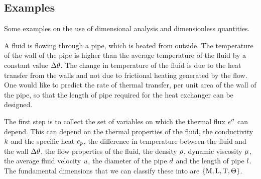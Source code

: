 \subsection{Examples}
Some examples on the use of dimensional analysis and dimensionless quantities.

\begin{example}
A fluid is flowing through a pipe, which is heated from outside. The temperature of the wall of the pipe is higher than the average temperature of the fluid by a constant value $\Delta\theta$. The change in temperature of the fluid is due to the heat transfer from the walls and not due to frictional heating generated by the flow. One would like to predict the rate of thermal transfer, per unit area of the wall of the pipe, so that the length of pipe required for the heat exchanger can be designed.
\end{example}

\begin{solution}
The first step is to collect the set of variables on which the thermal flux ${e}^{\prime\prime}$ can depend. This can depend on the thermal properties of the fluid, the conductivity $k$ and the specific heat $c_p$, the difference in temperature between the fluid and the wall $\Delta\theta$, the flow properties of the fluid, the density $\rho$, dynamic viscosity $\mu$, the average fluid velocity $u$, the diameter of the pipe $d$ and the length of pipe $l$. The fundamental dimensions that we can classify these into are $\left\lbrace{\text{M}, \text{L}, \text{T}, \Theta}\right\rbrace$.

\end{solution}
